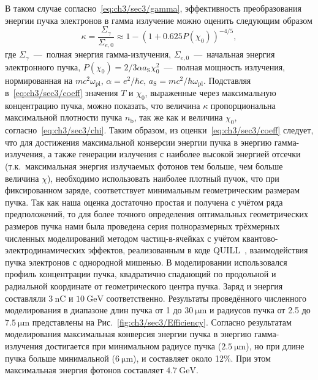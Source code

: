 В таком случае согласно~\eqref{eq:ch3/sec3/gamma}, эффективность преобразования энергии пучка электронов в гамма излучение можно оценить следующим образом
\begin{equation}
    \label{eq:ch3/sec3/coeff}
    \kappa = \frac{\Sigma_\gamma}{\Sigma_{e,0}} \approx 1 - {\left( 1 + 0.625 P(\chi_0) \right)}^{-4/5},
\end{equation}
где $\Sigma_\gamma$~---~полная энергия гамма-излучения, $\Sigma_{e,0}$~---~начальная энергия электронного пучка, $P(\chi_0) = 2/3 \alpha a_\mathrm{S} \chi_0^2$~---~полная мощность излучения, нормированная на $mc^2\omega_\mathrm{pl}$, $\alpha=e^2/\hbar c$, $a_\mathrm{S} = mc^2/\hbar\omega_\mathrm{pl}$.
Подставляя в~\eqref{eq:ch3/sec3/coeff} значения $T$ и $\chi_0$, выраженные через максимальную концентрацию пучка, можно показать, что величина $\kappa$ пропорциональна максимальной плотности пучка $n_\mathrm{b}$, так же как и величина $\chi_0$, согласно~\eqref{eq:ch3/sec3/chi}.
Таким образом, из оценки~\eqref{eq:ch3/sec3/coeff} следует, что для достижения максимальной конверсии энергии пучка в энергию гамма-излучения, а также генерации излучения с наиболее высокой энергией отсечки (т.к.~максимальная энергия излучаемых фотонов тем больше, чем больше величина $\chi$), необходимо использовать наиболее плотный пучок, что при фиксированном заряде, соответствует минимальным геометрическим размерам пучка. 
Так как наша оценка достаточно простая и получена с учётом ряда предположений, то для более точного определения оптимальных геометрических размеров пучка нами была проведена серия полноразмерных трёхмерных численных моделирований методом частиц-в-ячейках с учётом квантово-электродинамических эффектов, реализованным в коде QUILL~\cite{QUILL}, взаимодействия пучка электронов с однородной мишенью.
В моделировании использовался профиль концентрации пучка, квадратично спадающий по продольной и радиальной координате от геометрического центра пучка.
Заряд и энергия составляли $\SI{3}{\nano\coulomb}$ и $\SI{10}{\giga\electronvolt}$ соответственно.
Результаты проведённого численного моделирования в диапазоне длин пучка от 1 до $\SI{30}{\um}$ и радиусов пучка от 2.5 до $\SI{7.5}{\um}$ представлены на Рис.~\ref{fig:ch3/sec3/Efficiency}.
Согласно результатам моделирования максимальная конверсия энергии пучка в энергию гамма-излучения достигается при минимальном радиусе пучка ($\SI{2.5}{\um}$), но при длине пучка больше минимальной ($\SI{6}{\um}$), и составляет около 12\%.
При этом максимальная энергия фотонов составляет $\SI{4.7}{\giga\electronvolt}$.
  
